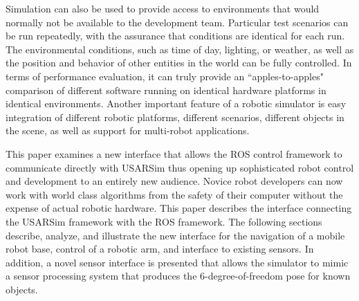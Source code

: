 Simulation can also be used to provide access to environments that would normally not be available to the development team. Particular test scenarios can be run repeatedly, with the assurance that conditions are identical for each run. The environmental conditions, such as time of day, lighting, or weather, as well as the position and behavior of other entities in the world can be fully controlled. In terms of performance evaluation, it can truly provide an ``apples-to-apples" comparison of different software running on identical hardware platforms in identical environments. Another important feature of a robotic simulator is easy integration of different robotic platforms, different scenarios, different objects in the scene, as well
as support for multi-robot applications.

This paper examines a new interface that allows the ROS control framework to communicate directly with USARSim thus opening up sophisticated robot control and development to an entirely new audience. Novice robot developers can now work with world class algorithms from the safety of their computer without the expense of actual robotic hardware.
This paper describes the interface connecting the USARSim framework with the ROS framework. The following sections describe, analyze, and illustrate the new interface for the navigation of a mobile robot base, control of a robotic arm, and interface to existing sensors. In addition, a novel sensor interface is presented that allows the simulator to mimic a sensor processing system that produces the 6-degree-of-freedom pose for known objects.


